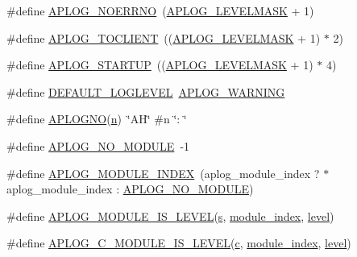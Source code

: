 \begin{DoxyCompactItemize}
\item 
\#define \hyperlink{group__APACHE__CORE__LOG_ga24e0d748a992633c7fb9e1ac51a4d47f}{A\+P\+L\+O\+G\+\_\+\+N\+O\+E\+R\+R\+NO}~(\hyperlink{group__APACHE__CORE__LOG_gad670a9e39225b017388108507a432fd3}{A\+P\+L\+O\+G\+\_\+\+L\+E\+V\+E\+L\+M\+A\+SK} + 1)
\item 
\#define \hyperlink{group__APACHE__CORE__LOG_ga5d58a2410e5f8be30429161385acd8dc}{A\+P\+L\+O\+G\+\_\+\+T\+O\+C\+L\+I\+E\+NT}~((\hyperlink{group__APACHE__CORE__LOG_gad670a9e39225b017388108507a432fd3}{A\+P\+L\+O\+G\+\_\+\+L\+E\+V\+E\+L\+M\+A\+SK} + 1) $\ast$ 2)
\item 
\#define \hyperlink{group__APACHE__CORE__LOG_ga39efd19b052fb6f39d8f263c16cc82b7}{A\+P\+L\+O\+G\+\_\+\+S\+T\+A\+R\+T\+UP}~((\hyperlink{group__APACHE__CORE__LOG_gad670a9e39225b017388108507a432fd3}{A\+P\+L\+O\+G\+\_\+\+L\+E\+V\+E\+L\+M\+A\+SK} + 1) $\ast$ 4)
\item 
\#define \hyperlink{group__APACHE__CORE__LOG_gaec8c265923c6714be1f4a42e252bc872}{D\+E\+F\+A\+U\+L\+T\+\_\+\+L\+O\+G\+L\+E\+V\+EL}~\hyperlink{group__APACHE__CORE__LOG_ga73e14aeff380a8a01c66d528162026fe}{A\+P\+L\+O\+G\+\_\+\+W\+A\+R\+N\+I\+NG}
\item 
\#define \hyperlink{group__APACHE__CORE__LOG_ga1dee8a07e06bc5b3de8b89662c2cd666}{A\+P\+L\+O\+G\+NO}(\hyperlink{pcregrep_8txt_ab232d334efb9173a12ae2940d035f460}{n})~\char`\"{}AH\char`\"{} \#n \char`\"{}\+: \char`\"{}
\item 
\#define \hyperlink{group__APACHE__CORE__LOG_gad04ae11f8e466af433e82e961d12a6bf}{A\+P\+L\+O\+G\+\_\+\+N\+O\+\_\+\+M\+O\+D\+U\+LE}~-\/1
\item 
\#define \hyperlink{group__APACHE__CORE__LOG_gae75325996d1b2cf6120dded4cb153a22}{A\+P\+L\+O\+G\+\_\+\+M\+O\+D\+U\+L\+E\+\_\+\+I\+N\+D\+EX}~(aplog\+\_\+module\+\_\+index ? $\ast$aplog\+\_\+module\+\_\+index \+: \hyperlink{group__APACHE__CORE__LOG_gad04ae11f8e466af433e82e961d12a6bf}{A\+P\+L\+O\+G\+\_\+\+N\+O\+\_\+\+M\+O\+D\+U\+LE})
\item 
\#define \hyperlink{group__APACHE__CORE__LOG_ga69598d1723ee9b59c34037a809b46816}{A\+P\+L\+O\+G\+\_\+\+M\+O\+D\+U\+L\+E\+\_\+\+I\+S\+\_\+\+L\+E\+V\+EL}(\hyperlink{pcretest_8txt_a062597889ba244b72877454b1d3adecf}{s},  \hyperlink{group__APACHE__CORE__SCRIPT_gafe3efe4874f4178a9d30f4a0889957c3}{module\+\_\+index},  \hyperlink{group__APACHE__CORE__LOG_ga46c1c4bc138aad1e20504bbee34f35a7}{level})
\item 
\#define \hyperlink{group__APACHE__CORE__LOG_ga4b7f2a5f7ebe1ee0d3051ba65bbfd419}{A\+P\+L\+O\+G\+\_\+\+C\+\_\+\+M\+O\+D\+U\+L\+E\+\_\+\+I\+S\+\_\+\+L\+E\+V\+EL}(\hyperlink{pcregrep_8txt_aef720ae5f62fa015619d00171d917416}{c},  \hyperlink{group__APACHE__CORE__SCRIPT_gafe3efe4874f4178a9d30f4a0889957c3}{module\+\_\+index},  \hyperlink{group__APACHE__CORE__LOG_ga46c1c4bc138aad1e20504bbee34f35a7}{level})

\end{DoxyCompactItemize}
